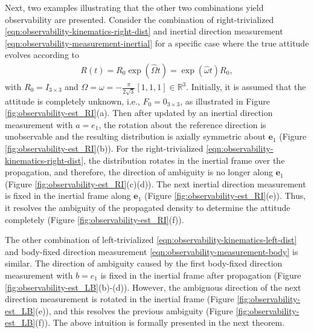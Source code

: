 Next, two examples illustrating that the other two combinations yield observability are presented.
Consider the combination of right-trivialized \eqref{eqn:observability-kinematics-right-dist} and inertial direction measurement \eqref{eqn:observability-measurement-inertial} for a specific case where the true attitude evolves according to
\begin{align}
	R(t) = R_0 \exp(\hat\Omega t) = \exp(\hat\omega t) R_0,\label{eqn:R_est}
\end{align}
with $R_0=I_{3\times 3}$ and $\Omega = \omega = -\frac{\pi}{2\sqrt{3}}[1, 1, 1]\in\mathbb{R}^3$. 
Initially, it is assumed that the attitude is completely unknown, i.e., $F_0 = 0_{3\times 3}$, as illustrated in Figure \ref{fig:observability-est_RI}(a).
Then after updated by an inertial direction measurement with $a = e_1$, the rotation about the reference direction is unobservable and the resulting distribution is axially symmetric about $\mathbf{e}_1$ (Figure \ref{fig:observability-est_RI}(b)).
For the right-trivialized \eqref{eqn:observability-kinematics-right-dist}, the distribution rotates in the inertial frame over the propagation, and therefore, the direction of ambiguity is no longer along $\bm{e}_1$ (Figure \ref{fig:observability-est_RI}(c)(d)).
The next inertial direction measurement is fixed in the inertial frame along $\bm{e}_1$ (Figure \ref{fig:observability-est_RI}(e)).
Thus, it resolves the ambiguity of the propagated density to determine the attitude completely (Figure \ref{fig:observability-est_RI}(f)).

The other combination of left-trivialized \eqref{eqn:observability-kinematics-left-dist} and body-fixed direction measurement \eqref{eqn:observability-measurement-body} is similar.
The direction of ambiguity caused by the first body-fixed direction measurement with $b=e_1$ is fixed in the inertial frame after propagation (Figure  \ref{fig:observability-est_LB}(b)-(d)).
However, the ambiguous direction of the next direction measurement is rotated in the inertial frame (Figure \ref{fig:observability-est_LB}(e)), and this resolves the previous ambiguity (Figure \ref{fig:observability-est_LB}(f)).
The above intuition is formally presented in the next theorem.


